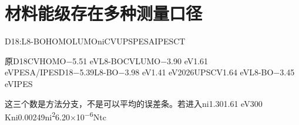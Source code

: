 \documentclass[11pt,a4paper]{article}
\begin{document}
\section{{\cjkfont 材料能级存在多种测量口径}\allowbreak{}}\label{sec:37}
D18:L8-BO\allowbreak{}HOMO\allowbreak{}LUMO\allowbreak{}ni\allowbreak{}CV\allowbreak{}UPS\allowbreak{}PESA\allowbreak{}IPES\allowbreak{}CT\allowbreak{}
\par
{\cjkfont 原}\allowbreak{}D18\allowbreak{}CV\allowbreak{}HOMO−5.51 eV\allowbreak{}L8-BO\allowbreak{}CV\allowbreak{}LUMO−3.90 eV\allowbreak{}1.61 eV\allowbreak{}PESA/IPES\allowbreak{}D18−5.39\allowbreak{}L8-BO−3.98 eV\allowbreak{}1.41 eV\allowbreak{}2026\allowbreak{}UPS\allowbreak{}CV\allowbreak{}1.64 eV\allowbreak{}L8-BO\allowbreak{}−3.45 eV\allowbreak{}IPES\allowbreak{}
\par
{\cjkfont 这三个数是方法分支，不是可以平均的误差条。若进入}\allowbreak{}ni\allowbreak{}1.30\allowbreak{}1.61 eV\allowbreak{}300 K\allowbreak{}ni\allowbreak{}0.00249\allowbreak{}ni\textsuperscript{2}\allowbreak{}6.20\ensuremath{\times}10\textsuperscript{−6}\allowbreak{}Nt\allowbreak{}c\allowbreak{}
\end{document}
